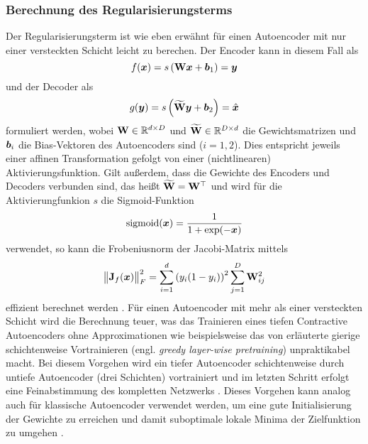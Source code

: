 \subsubsection{Berechnung des Regularisierungsterms}
\label{ch:MethodenDerDimRed:ML:CAE:BerechnungRegTerm}
Der Regularisierungsterm ist wie eben erwähnt für einen Autoencoder mit nur einer versteckten Schicht leicht zu berechen. Der Encoder
kann in diesem Fall als
\begin{equation}
	f(\vect{x}) = s \left( \mat{W} \vect{x} + \vect{b}_1 \right) = \vect{y}
\end{equation}
und der Decoder als
\begin{equation}
	g(\vect{y}) = s \left( \mat{\widetilde{W}} \vect{y} + \vect{b}_2 \right) = \estNormal{\vect{x}}
\end{equation}
formuliert werden, wobei $\mat{W} \in \real^{d \times D}$ und $\mat{\widetilde{W}} \in \real^{D \times d}$ die Gewichtsmatrizen und $\vect{b}_i$ die Bias-Vektoren des Autoencoders sind ($i = 1, 2$). Dies entspricht jeweils einer affinen Transformation gefolgt von einer (nichtlinearen) Aktivierungsfunktion. Gilt außerdem, dass die Gewichte des Encoders und Decoders verbunden sind, das heißt $\mat{\widetilde{W}} = \tr{\mat{W}}$ und wird für die Aktivierungfunkion $s$ die Sigmoid-Funktion
\begin{equation}
	\operatorname{sigmoid}(\vect{x}) = \frac{1}{1 + \exp (-\vect{x})}
\end{equation}
verwendet, so kann die Frobeniusnorm der Jacobi-Matrix mittels
\begin{equation}
	\norm[\big]{\mat{J}_f(\vect{x})}_F^2 = \sum_{i = 1}^d \left( y_i (1 - y_i)\right)^2 \sum_{j = 1}^D \mat{W}^2_{ij}
\end{equation}
effizient berechnet werden \parencite[4]{Rifai.2011}. Für einen Autoencoder mit mehr als einer versteckten Schicht wird die
Berechnung teuer, was das Trainieren eines tiefen Contractive Autoencoders ohne Approximationen wie
beispielsweise das von \textcite{Bengio.2006} erläuterte gierige schichtenweise Vortrainieren
(engl. \textit{greedy layer-wise pretraining}) unpraktikabel macht. Bei diesem Vorgehen wird ein
tiefer Autoencoder schichtenweise durch untiefe Autoencoder (drei Schichten) vortrainiert und im
letzten Schritt erfolgt eine Feinabstimmung des kompletten Netzwerks \parencite[522]{Goodfellow.2016}. Dieses Vorgehen kann analog auch für klassische Autoencoder verwendet
werden, um eine gute Initialisierung der Gewichte zu erreichen und damit suboptimale lokale Minima
der Zielfunktion zu umgehen \parencite[509]{Goodfellow.2016}.